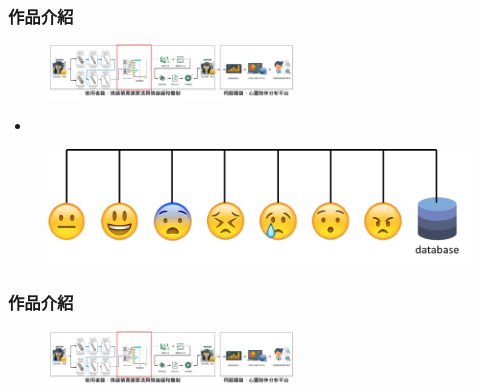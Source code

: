 \documentclass[10pt, conference, compsocconf]{beamer}
\begin{document}
\begin{CJK}{UTF8}{}
\begin{frame}
\end{frame}

\begin{frame}
\frametitle{作品介紹}
\begin{figure}[t]
\begin{flushright}
\vspace{-5mm}
\includegraphics[width=6.5cm]{./Figures/framework_version4_3.pdf}
\end{flushright}
\end{figure}

\vspace{-5mm}

\begin{itemize}
\item {}
\end{itemize}

\vspace{5mm}
\begin{figure}[!t]
\begin{center}
\includegraphics[width=12.3cm]{./Figures/501.png}
\end{center}
\end{figure}

\end{frame}

\begin{frame}
\frametitle{作品介紹}
\begin{figure}[t]
\begin{flushright}
\vspace{-3mm}
\includegraphics[width=6.5cm]{./Figures/framework_version4_3.pdf}
\end{flushright}
\end{figure}


\end{frame}
\end{CJK}
\end{document}
